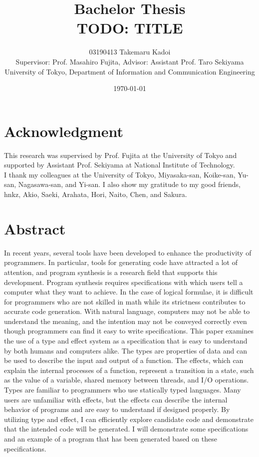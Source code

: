 \documentclass[12pt, a4paper, titlepage]{report}
\title{
  Bachelor Thesis \\
  TODO: TITLE
}
\author{
  03190413 Takemaru Kadoi
  \\[1cm]
  {\small Supervisor: Prof. Masahiro Fujita},
  {\small Advisor: Assistant Prof. Taro Sekiyama}
  \\[1cm]
  {\small University of Tokyo, Department of Information and Communication Engineering}
}
\date{\today}
\begin{document}


\maketitle
\newpage
\tableofcontents
\newpage

\chapter*{Acknowledgment}
This research was supervised by Prof. Fujita at the University of Tokyo and supported by Assistant Prof. Sekiyama at National Institute of Technology. \\
I thank my colleagues at the University of Tokyo, Miyasaka-san, Koike-san, Yu-san, Nagasawa-san, and Yi-san.
I also show my gratitude to my good friends, hnkz, Akio, Saeki, Arahata, Hori, Naito, Chen, and Sakura.

\chapter{Abstract} \label{chapter:abstract}
In recent years, several tools have been developed to enhance the productivity of programmers.
In particular, tools for generating code have attracted a lot of attention, and program synthesis is a research field that supports this development.
Program synthesis requires specifications with which users tell a computer what they want to achieve.
In the case of logical formulae, it is
difficult for programmers who are not skilled in math while its strictness contributes to accurate code generation.
With natural language, computers may not be able to understand the meaning, and the intention may not be conveyed correctly even though programmers can find it easy to write specifications.
This paper examines the use of a type and effect system as a specification that is easy to understand by both humans and computers alike. The types are properties of data and can be used to describe the input and output of a function. The effects, which can explain the internal processes of a function, represent a transition in a state, such as the value of a variable, shared memory between threads, and I/O operations.
Types are familiar to programmers who use statically typed languages.
Many users are unfamiliar with effects, but the effects can describe the internal behavior of programs and are easy to understand if designed properly.
By utilizing type and effect, I can efficiently explore candidate code and demonstrate that the intended code will be generated. I will demonstrate some specifications and an example of a program that has been generated based on these specifications.
 
\end{document}
